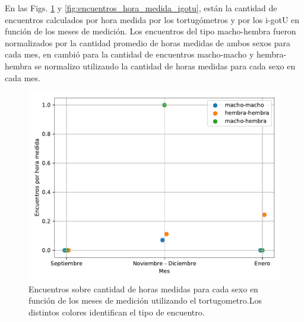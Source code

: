 En las Figs. \ref{fig:encuentros_hora_medida_tortugometro} y \ref{fig:encuentros_hora_medida_igotu}, están la cantidad de encuentros calculados por hora medida por los tortugómetros y por los i-gotU en función de los meses de medición. Los encuentros del tipo macho-hembra fueron normalizados por la cantidad promedio de horas medidas de ambos sexos para cada mes, en cambió para la cantidad de encuentros macho-macho y hembra-hembra se normalizo utilizando la cantidad de horas medidas para cada sexo en cada mes.  
\begin{figure}[ht]
    \begin{center}
       
   
    \includegraphics[width=\imsize]{Chap2/encuentros_por_hora_tortugometro.pdf}
\end{center}
    \caption[Encuentros por hora medida tomando los datos del tortugometro.]{Encuentros sobre cantidad de horas medidas para cada sexo en función de los meses de medición utilizando el tortugometro.Los distintos colores identifican el tipo de encuentro.}
    \label{fig:encuentros_hora_medida_tortugometro}
\end{figure}
 
